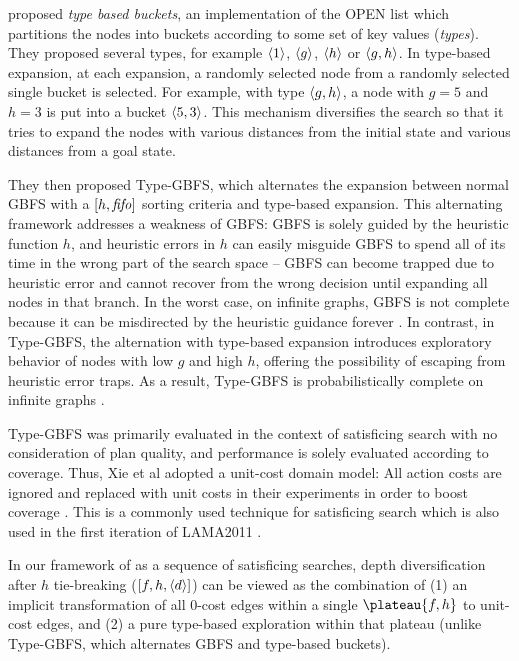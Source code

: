 \citeauthor{xie14type} proposed \emph{type based buckets}, an implementation of the OPEN list which partitions the nodes into buckets according to some set of key values (\emph{types}). They proposed several types, for example ${\left<1\right>}$, ${\left<g\right>}$, ${\left<h\right>}$ or ${\left<g,h\right>}$. In type-based expansion, at each expansion, a randomly selected node from a randomly selected single bucket is selected. For example, with type ${\left<g,h\right>}$, a node with $g=5$ and $h=3$ is put into a bucket  ${\left<5,3\right>}$. This mechanism diversifies the search so that it tries to expand the nodes with various distances from the initial state and various distances from a goal state.

They then proposed Type-GBFS, which alternates the expansion between normal GBFS with a $[h,{\text{\textit{fifo}}}]$ sorting criteria and type-based expansion. This alternating framework addresses a weakness of GBFS: 
GBFS is solely guided by the heuristic function $h$, and heuristic errors in $h$ can easily misguide GBFS to spend all of its time in the wrong part of the search space -- GBFS can become trapped due to heuristic error and cannot recover from the wrong decision until expanding all nodes in that branch.
In the worst case, on infinite graphs, GBFS is not complete because it can be misdirected by the heuristic guidance forever \cite{Valenzano2016}.
In contrast, in Type-GBFS, the alternation with type-based expansion introduces exploratory behavior of nodes with low $g$ and high $h$, offering the possibility of escaping from heuristic error traps.
As a result, Type-GBFS is probabilistically complete on infinite graphs \cite{Valenzano2016}.

Type-GBFS was primarily evaluated in the context of satisficing search with no consideration of plan quality, and performance is solely evaluated according to coverage.
Thus, Xie et al adopted a unit-cost domain model: All action costs are ignored and replaced with unit costs in their experiments in order to boost coverage \cite{xie14type}. This is a commonly used technique for satisficing search which is also used in the first iteration of LAMA2011 \cite{richter2011lama}. 


In our framework of \astar as a sequence of satisficing searches, depth diversification after $h$ tie-breaking ($[f,h,{\left<d\right>}]$) can be viewed as the combination of (1) an implicit transformation of all 0-cost edges within a single $\plateau{f,h}$ to unit-cost edges, and (2) a pure type-based exploration within that plateau (unlike Type-GBFS, which alternates GBFS and type-based buckets).
 
